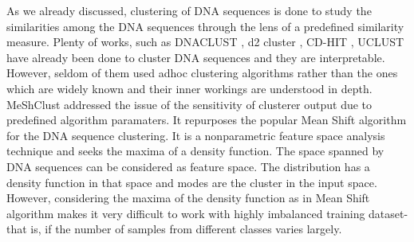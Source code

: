 \documentclass[oneside, twocolumn, a4paper, 10pt]{IEEEtran}
\begin{document}
\par
As we already discussed, clustering of DNA sequences is done to study the similarities among the DNA sequences through the lens of a predefined similarity measure. Plenty of works, such as DNACLUST \cite{11}, d2 cluster \cite{12}, CD-HIT \cite{13}, UCLUST \cite{14} have already been done to cluster DNA sequences and they are interpretable. However, seldom of them used adhoc clustering algorithms rather than the ones which are widely known and their inner workings are understood in depth. MeShClust \cite{15} addressed the issue of the sensitivity of clusterer output due to predefined algorithm paramaters. It repurposes the popular Mean Shift algorithm \cite{16} for the DNA sequence clustering. It is a nonparametric feature space analysis technique and seeks the maxima of a density function. The space spanned by DNA sequences can be considered as feature space. The distribution has a density function in that space and modes are the cluster in the input space. However, considering the maxima of the density function as in Mean Shift algorithm makes it very difficult to work with highly imbalanced training dataset- that is, if the number of samples from different classes varies largely.
%
\end{document}
